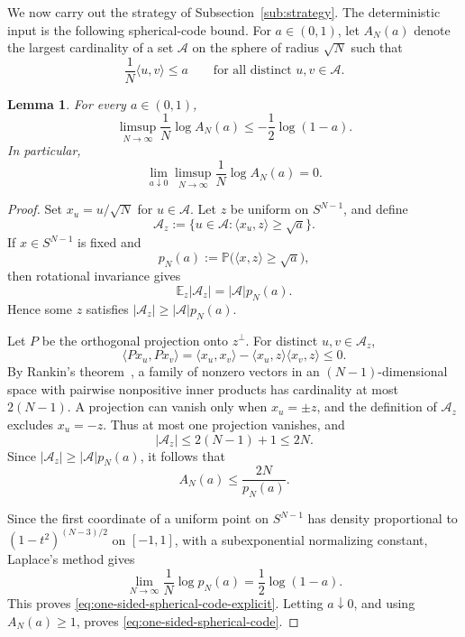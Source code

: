 \documentclass[a4paper,10pt,reqno]{amsart}
\numberwithin{equation}{section}
\newtheorem{lemma}[proposition]{Lemma}%
\newcommand{\dP}{\mathbb{P}}%
\newcommand{\dE}{\mathbb{E}}%
\begin{document}
	We now carry out the strategy of Subsection~\ref{sub:strategy}. The
	deterministic input is the following spherical-code bound.
	For \(a\in(0,1)\), let \(A_N(a)\) denote the largest cardinality of a set
	\(\mathcal A\) on the sphere of radius \(\sqrt N\) such that
	\[
	\frac1N\langle u,v\rangle\le a
	\qquad
	\text{for all distinct \(u,v\in\mathcal A\)}.
	\]
	
	\begin{lemma}
		\label{lem:one-sided-spherical-code}
		For every \(a\in(0,1)\),
		\begin{equation}\label{eq:one-sided-spherical-code-explicit}
			\limsup_{N\to\infty}
			\frac1N\log A_N(a)
			\le-\frac12\log(1-a).
		\end{equation}
		In particular,
		\begin{equation}\label{eq:one-sided-spherical-code}
			\lim_{a\downarrow0}
			\limsup_{N\to\infty}
			\frac1N\log A_N(a)=0.
		\end{equation}
	\end{lemma}
	
	\begin{proof}
		Set \(x_u=u/\sqrt N\) for \(u\in\mathcal A\). Let \(z\) be uniform on
		\(S^{N-1}\), and define
		\[
		\mathcal A_z
		:=\{u\in\mathcal A:\langle x_u,z\rangle\ge\sqrt a\}.
		\]
		If \(x\in S^{N-1}\) is fixed and
		\[
		p_N(a):=\dP\bigl(\langle x,z\rangle\ge\sqrt a\bigr),
		\]
		then rotational invariance gives
		\[
		\dE_z|\mathcal A_z|=|\mathcal A|p_N(a).
		\]
		Hence some \(z\) satisfies
		\(|\mathcal A_z|\ge|\mathcal A|p_N(a)\).
		
		Let \(P\) be the orthogonal projection onto \(z^\perp\). For distinct
		\(u,v\in\mathcal A_z\),
		\[
		\langle Px_u,Px_v\rangle
		=
		\langle x_u,x_v\rangle
		-\langle x_u,z\rangle\langle x_v,z\rangle
		\le0.
		\]
		By Rankin's theorem~\cite{Rankin1955}, a family of nonzero vectors in an
		\((N-1)\)-dimensional space with pairwise nonpositive inner products has
		cardinality at most \(2(N-1)\). A projection can vanish only when
		\(x_u=\pm z\), and the definition of \(\mathcal A_z\) excludes
		\(x_u=-z\). Thus at most one projection vanishes, and
		\[
		|\mathcal A_z|\le2(N-1)+1\le2N.
		\]
		Since \(|\mathcal A_z|\ge|\mathcal A|p_N(a)\), it follows that
		\[
		A_N(a)\le\frac{2N}{p_N(a)}.
		\]
		
		Since the first coordinate of a uniform point on \(S^{N-1}\) has density
		proportional to \((1-t^2)^{(N-3)/2}\) on \([-1,1]\), with a
		subexponential normalizing constant, Laplace's method gives
		\[
		\lim_{N\to\infty}\frac1N\log p_N(a)
		=\frac12\log(1-a).
		\]
		This proves \eqref{eq:one-sided-spherical-code-explicit}. Letting
		\(a\downarrow0\), and using \(A_N(a)\ge1\), proves
		\eqref{eq:one-sided-spherical-code}.
	\end{proof}
	
\end{document}
